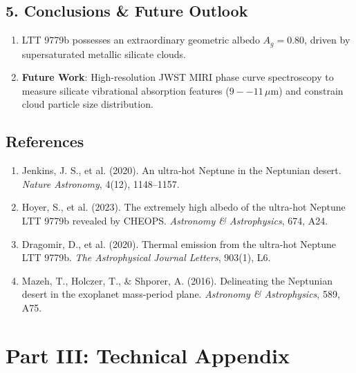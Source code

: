 \documentclass[11pt,a4paper]{article}
\begin{document}
\subsection*{5. Conclusions \& Future Outlook}
\begin{enumerate}
    \item LTT 9779b possesses an extraordinary geometric albedo $A_g = 0.80$, driven by supersaturated metallic silicate clouds.
    \item \textbf{Future Work}: High-resolution JWST MIRI phase curve spectroscopy to measure silicate vibrational absorption features ($9--11\,\mu$m) and constrain cloud particle size distribution.
\end{enumerate}

\subsection*{References}
\begin{enumerate}
    \item Jenkins, J. S., et al. (2020). An ultra-hot Neptune in the Neptunian desert. \textit{Nature Astronomy}, 4(12), 1148--1157.
    \item Hoyer, S., et al. (2023). The extremely high albedo of the ultra-hot Neptune LTT 9779b revealed by CHEOPS. \textit{Astronomy \& Astrophysics}, 674, A24.
    \item Dragomir, D., et al. (2020). Thermal emission from the ultra-hot Neptune LTT 9779b. \textit{The Astrophysical Journal Letters}, 903(1), L6.
    \item Mazeh, T., Holczer, T., \& Shporer, A. (2016). Delineating the Neptunian desert in the exoplanet mass-period plane. \textit{Astronomy \& Astrophysics}, 589, A75.
\end{enumerate}

\newpage

\section*{Part III: Technical Appendix}
\end{document}
